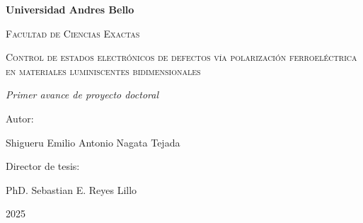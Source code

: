\begin{titlepage}
    \centering
    {\bfseries\LARGE Universidad Andres Bello \par}
    \vspace{1cm}
    {\scshape\Large Facultad de Ciencias Exactas \par}
    \vspace{3cm}
    {\scshape\Huge Control de estados electrónicos de defectos vía polarización ferroeléctrica en materiales luminiscentes bidimensionales \par}
    {\itshape\Large Primer avance de proyecto doctoral \par}
    \vfill
    {\Large Autor: \par}
    {\Large Shigueru Emilio Antonio Nagata Tejada \par}
    \vfill
    {\Large Director de tesis: \par}
    {\Large PhD. Sebastian E. Reyes Lillo \par}
    \vfill
    {\Large 2025}
\end{titlepage}
